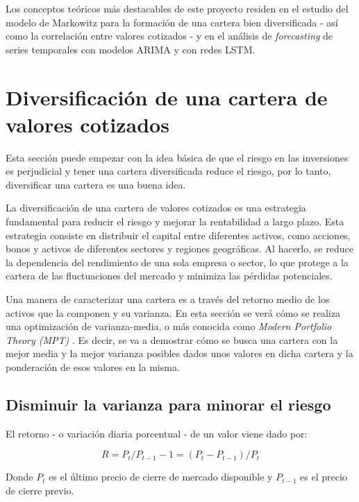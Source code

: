
Los conceptos teóricos más destacables de este proyecto residen en el estudio del modelo de Markowitz para la formación de una cartera bien diversificada - así como la correlación entre valores cotizados - y  en el análisis de \emph{forecasting} de series temporales con modelos ARIMA y con redes LSTM. 


\section{Diversificación de una cartera de valores cotizados}\label{diversificar_cartera}

Esta sección puede empezar con la idea básica de que el riesgo en las inversiones es perjudicial y tener una cartera diversificada reduce el riesgo, por lo tanto, diversificar una cartera es una buena idea. 

La diversificación de una cartera de valores cotizados es una estrategia fundamental para reducir el riesgo y mejorar la rentabilidad a largo plazo. Esta estrategia consiste en distribuir el capital entre diferentes activos, como acciones, bonos y activos de diferentes sectores y regiones geográficas. Al hacerlo, se reduce la dependencia del rendimiento de una sola empresa o sector, lo que protege a la cartera de las fluctuaciones del mercado y minimiza las pérdidas potenciales.

Una manera de caracterizar una cartera es a través del retorno medio de los activos que la componen y su varianza. En esta sección se verá cómo se realiza una optimización de varianza-media, o más conocida como \emph{Modern Portfolio Theory (MPT)} \citep{wiki:mpt}. Es decir, se va a demostrar cómo se busca una cartera con la mejor media y la mejor varianza posibles dados unos valores en dicha cartera y la ponderación de esos valores en la misma. 


\subsection{Disminuir la varianza para minorar el riesgo}

El retorno - o variación diaria porcentual - de un valor viene dado por:

\begin{equation}
	R = P_{t}/P_{t-1} - 1 = (P_{t} - P_{t-1})/P_{t}
\end{equation}

Donde $P_{t}$ es el último precio de cierre de mercado disponible y $P_{t-1}$ es el precio de cierre previo. 

